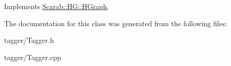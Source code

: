 Implements \hyperlink{classScarab_1_1HG_1_1HGraph_ab5aa11c932b28864b56f28e0babbc1c1}{Scarab::HG::HGraph}.



The documentation for this class was generated from the following files:\begin{DoxyCompactItemize}
\item 
tagger/Tagger.h\item 
tagger/Tagger.cpp\end{DoxyCompactItemize}
